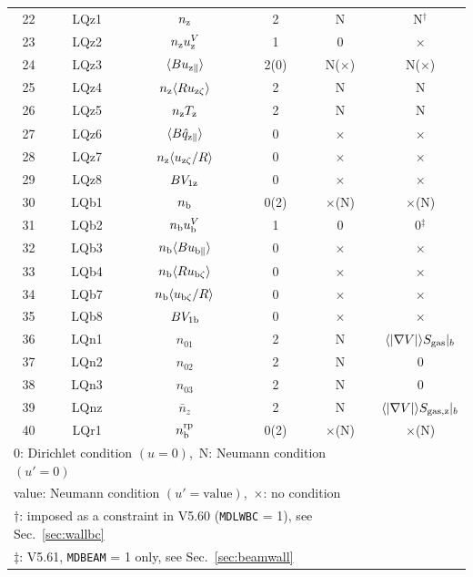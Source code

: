 \documentclass[11pt]{article}
\def\r#1{{\rm#1}}
\def\aves#1{\langle#1\rangle}
\def\para{\parallel}
\def\nz{n_\r{z}}
\def\nb{n_\r{b}}
\def\Tz{T_\r{z}}
\def\uzt#1{u_{\r{#1}\zeta}}
\def\upara#1{u_{\r{#1}\para}}
\def\qhatpara#1{\hat{q}_{\r{#1}\para}}
\def\uV#1{u_\r{#1}^V}
\def\nbrp{n_\r{b}^\r{rp}}
\def\nna{n_{01}}
\def\nnb{n_{02}}
\def\nnc{n_{03}}
\def\nnz{\bar{n}_{z}}
\begin{document}
\begin{tabular}{|c|c|c|c|c|c|}
 22   & LQz1 & $\nz$                  & 2    &  N           & N$^\dagger$\\
 23   & LQz2 & $\nz\uV{z}$            & 1    &  0           & $\times$\\
 24   & LQz3 & $\aves{B\upara{z}}$    & 2(0) &  N($\times$) & N($\times$)\\
 25   & LQz4 & $\nz\aves{R\uzt{z}}$   & 2    &  N           & N\\
 26   & LQz5 & $\nz \Tz$              & 2    &  N           & N\\
 27   & LQz6 & $\aves{B\qhatpara{z}}$ & 0    &  $\times$    & $\times$\\
 28   & LQz7 & $\nz\aves{\uzt{z}/R}$  & 0    &  $\times$    & $\times$\\
 29   & LQz8 & $B V_{1\r{z}}$         & 0    &  $\times$    & $\times$\\
 30   & LQb1 & $\nb$                  & 0(2) &  $\times$(N) & $\times$(N)\\
 31   & LQb2 & $\nb\uV{b}$            & 1    &  0           & 0$^\ddagger$\\
 32   & LQb3 & $\nb\aves{B\upara{b}}$ & 0    &  $\times$    & $\times$\\
 33   & LQb4 & $\nb\aves{R\uzt{b}}$   & 0    &  $\times$    & $\times$\\
 34   & LQb7 & $\nb\aves{\uzt{b}/R}$  & 0    &  $\times$    & $\times$\\
 35   & LQb8 & $B V_{1\r{b}}$         & 0    &  $\times$    & $\times$\\
 36   & LQn1 & $\nna$                 & 2    &  N           & $\aves{|\nabla V|}S_\r{gas}|_b$\\
 37   & LQn2 & $\nnb$                 & 2    &  N           & 0\\
 38   & LQn3 & $\nnc$                 & 2    &  N           & 0\\
 39   & LQnz & $\nnz$                 & 2    &  N           & $\aves{|\nabla V|}S_\r{gas,z}|_b$\\
 40   & LQr1 & $\nbrp$                & 0(2) &  $\times$(N) & $\times$(N)\\\hline
 \multicolumn{5}{l}{0: Dirichlet condition $(u=0)$,\ 
                    N: Neumann condition $(u'=0)$}\\
 \multicolumn{5}{l}{value: Neumann condition $(u'=\mbox{value})$,\ 
                    $\times$: no condition}\\
 \multicolumn{5}{l}{$\dagger$: imposed as a constraint in V5.60 (\texttt{MDLWBC} = 1), see Sec.~\ref{sec:wallbc}}\\
 \multicolumn{5}{l}{$\ddagger$: V5.61, \texttt{MDBEAM} = 1 only, see Sec.~\ref{sec:beamwall}}
\end{tabular}
%
\end{document}
